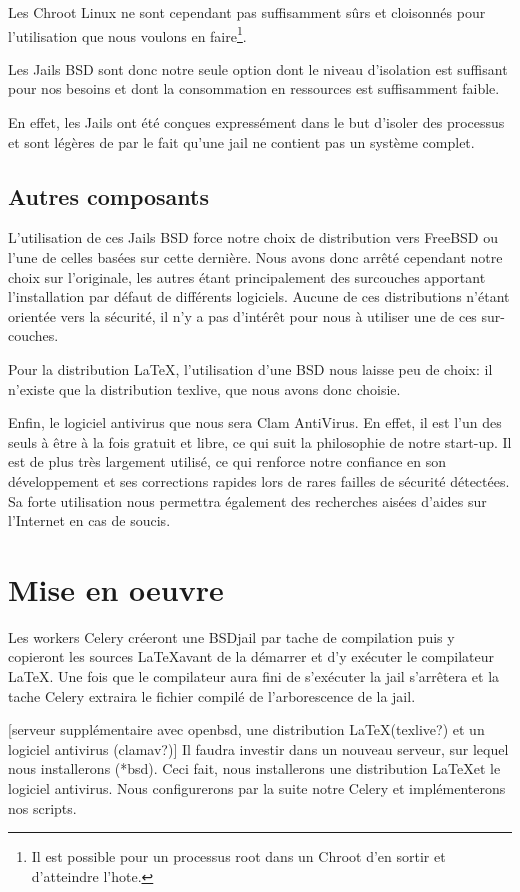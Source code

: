 \documentclass[10pt,a4paper]{article}
\begin{document}
Les Chroot Linux ne sont cependant pas suffisamment sûrs et cloisonnés pour l'utilisation que nous voulons en faire\footnote{Il est possible pour un processus root dans un Chroot d'en sortir et d'atteindre l'hote.}.

Les Jails BSD sont donc notre seule option dont le niveau d'isolation est suffisant pour nos besoins et dont la consommation en ressources est suffisamment faible.

En effet, les Jails ont été conçues expressément dans le but d'isoler des processus et sont légères de par le fait qu'une jail ne contient pas un système complet.

\subsection{Autres composants}
L'utilisation de ces Jails BSD force notre choix de distribution vers FreeBSD ou l'une de celles basées sur cette dernière. Nous avons donc arrêté cependant notre choix sur l'originale, les autres étant principalement des surcouches apportant l'installation par défaut de différents logiciels. Aucune de ces distributions n'étant orientée vers la sécurité, il n'y a pas d'intérêt pour nous à utiliser une de ces sur-couches.

Pour la distribution \LaTeX, l'utilisation d'une BSD nous laisse peu de choix: il n'existe que la distribution texlive, que nous avons donc choisie.

Enfin, le logiciel antivirus que nous  sera Clam AntiVirus.
En effet, il est l'un des seuls à être à la fois gratuit et libre, ce qui suit la philosophie de notre start-up.
Il est de plus très largement utilisé, ce qui renforce notre confiance en son développement et ses corrections rapides lors de rares failles de sécurité détectées.
Sa forte utilisation nous permettra également des recherches aisées d'aides sur l'Internet en cas de soucis.

\section{Mise en oeuvre}

Les workers Celery créeront une BSDjail par tache de compilation puis y copieront les sources \LaTeX avant de la démarrer et d'y exécuter le compilateur \LaTeX.
Une fois que le compilateur aura fini de s'exécuter la jail s'arrêtera et la tache Celery extraira le fichier compilé de l'arborescence de la jail.

[serveur supplémentaire avec openbsd, une distribution \LaTeX (texlive?) et un logiciel antivirus (clamav?)]
Il faudra investir dans un nouveau serveur, sur lequel nous installerons (*bsd).
Ceci fait, nous installerons une distribution \LaTeX et le logiciel antivirus.
Nous configurerons par la suite notre Celery et implémenterons nos scripts.
\end{document}

